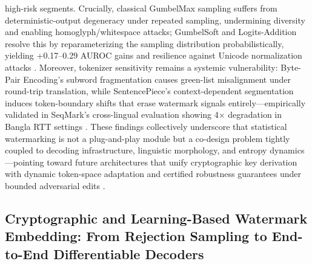 \documentclass[11pt,a4paper]{article}
\begin{document}
high-risk segments. Crucially, classical GumbelMax sampling suffers from deterministic-output degeneracy under repeated sampling, undermining diversity and enabling homoglyph/whitespace attacks; GumbelSoft and Logits-Addition resolve this by reparameterizing the sampling distribution probabilistically, yielding +0.17--0.29 AUROC gains and resilience against Unicode normalization attacks \cite{arxiv:2402.05864}. Moreover, tokenizer sensitivity remains a systemic vulnerability: Byte-Pair Encoding's subword fragmentation causes green-list misalignment under round-trip translation, while SentencePiece's context-dependent segmentation induces token-boundary shifts that erase watermark signals entirely---empirically validated in SeqMark's cross-lingual evaluation showing 4$\times$ degradation in Bangla RTT settings \cite{doi:10.1038/s41586-024-08025-4}. These findings collectively underscore that statistical watermarking is not a plug-and-play module but a co-design problem tightly coupled to decoding infrastructure, linguistic morphology, and entropy dynamics---pointing toward future architectures that unify cryptographic key derivation with dynamic token-space adaptation and certified robustness guarantees under bounded adversarial edits \cite{arxiv:2306.09194}.


\subsection{Cryptographic and Learning-Based Watermark Embedding: From Rejection Sampling to End-to-End Differentiable Decoders}
\end{document}
